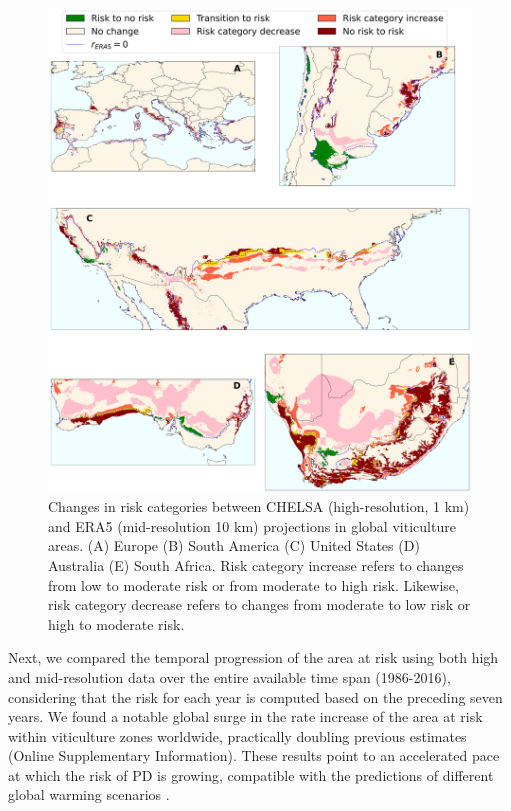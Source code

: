\begin{figure}[H]
    \centering
    \includegraphics[width=\textwidth]{Figures/ERA5_vs_CHELSA_zones.pdf}
    \caption{Changes in risk categories between CHELSA (high-resolution, 1
        km) and ERA5 (mid-resolution 10 km) projections in global viticulture
        areas.
        (A) Europe (B) South America (C) United States (D) Australia (E) South
        Africa.
        Risk category increase refers to changes from low to moderate risk or
        from
        moderate to high risk. Likewise, risk category decrease refers to
        changes from
        moderate to low risk or high to moderate risk.}
    \label{fig:risk_categories_dif}
\end{figure}

Next, we compared the temporal progression of the area at risk using both
high and mid-resolution data over the entire available time span (1986-2016),
considering that the risk for each year is computed based on the preceding
seven years. We found a notable global surge in the rate increase of the area
at risk within viticulture zones worldwide, practically doubling previous
estimates (Online Supplementary Information). These results point to an
accelerated
pace at which the risk of PD is growing, compatible with the predictions of
different global warming scenarios \cite{GimenezRomero2023_PD}.

